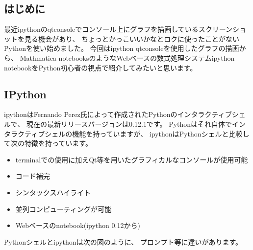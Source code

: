 \documentclass[mingoth,a4paper]{jsarticle}
\begin{document}
\subsection{はじめに}

最近ipythonのqtconsoleでコンソール上にグラフを描画しているスクリーンショットを見る機会があり、
ちょっとかっこいいかなとロクに使ったことがないPythonを使い始めました。
今回はipython qtconsoleを使用したグラフの描画から、
Mathmatica notebooksのようなWebベースの数式処理システムipython notebookをPython初心者の視点で紹介してみたいと思います。

\subsection{IPython}

ipythonはFernando Perez氏によって作成されたPythonのインタラクティブシェルで、
現在の最新リリースバージョンは0.12.1です。
Pythonはそれ自体でインタラクティブシェルの機能を持っていますが、
ipythonはPythonシェルと比較して次の特徴を持っています。

\begin{itemize}
 \item terminalでの使用に加えQt等を用いたグラフィカルなコンソールが使用可能
 \item コード補完
 \item シンタックスハイライト
 \item 並列コンピューティングが可能
 \item Webベースのnotebook(ipython 0.12から)
\end{itemize}

Pythonシェルとipythonは次の図のように、
プロンプト等に違いがあります。
\end{document}
